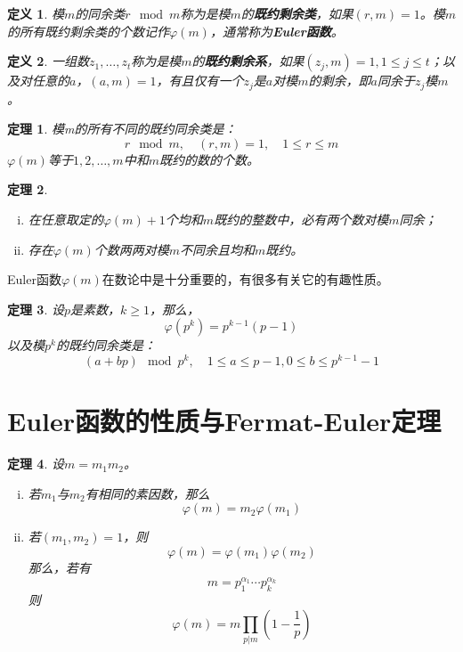 \documentclass{ctexrep}
\newcommand{\bbold}[1]{\textbf{#1}}
\newtheorem{thrm}{定理}[section]
\newtheorem{defn}{定义}[section]
\begin{document}
\begin{defn}
模$m$的同余类$r\mod m$称为是模$m$的\bbold{既约剩余类}，如果$(r,m)=1$。模$m$的所有既约剩余类的个数记作$\varphi(m)$，通常称为\bbold{Euler函数}。
\end{defn}

\begin{defn}
一组数$z_1,\dotsc,z_t$称为是模$m$的\bbold{既约剩余系}，如果$(z_j,m)=1,1\leq j\leq t$；以及对任意的$a$，$(a,m)=1$，有且仅有一个$z_j$是$a$对模$m$的剩余，即$a$同余于$z_j$模$m$。
\end{defn}

\begin{thrm}
模m的所有不同的既约同余类是：
\begin{equation}
r\mod m,\quad (r,m)=1,\quad 1\leq r\leq m
\end{equation}
$\varphi(m)$等于$1,2,\dotsc,m$中和$m$既约的数的个数。
\end{thrm}

\begin{thrm}
\begin{enumerate}[(i)]
\item 在任意取定的$\varphi(m)+1$个均和$m$既约的整数中，必有两个数对模$m$同余；
\item 存在$\varphi(m)$个数两两对模$m$不同余且均和$m$既约。
\end{enumerate}
\end{thrm}

Euler函数$\varphi(m)$在数论中是十分重要的，有很多有关它的有趣性质。

\begin{thrm}
设$p$是素数，$k\geq 1$，那么，
\begin{displaymath}
\varphi(p^k)=p^{k-1}(p-1)
\end{displaymath}
以及模$p^k$的既约同余类是：
\begin{displaymath}
(a+bp)\mod p^k,\quad 1\leq a\leq p-1, 0\leq b\leq p^{k-1}-1
\end{displaymath}
\end{thrm}

\section{Euler函数的性质与Fermat-Euler定理}

\begin{thrm}
设$m=m_1 m_2$。
\begin{enumerate}[(i)]
\item 若$m_1$与$m_2$有相同的素因数，那么
\begin{equation}
\varphi(m)=m_2\varphi(m_1)
\end{equation}
\item 若$(m_1,m_2)=1$，则
\begin{equation}
\varphi(m)=\varphi(m_1)\varphi(m_2)
\end{equation}
那么，若有
\begin{displaymath}
m=p_1^{\alpha_1} \dotsm p_k^{\alpha_k}
\end{displaymath}
则
\begin{equation}
\varphi(m)=m\prod_{p|m}\left(1-\frac{1}{p}\right)
\end{equation}
\end{enumerate}
\end{thrm}
\end{document}

